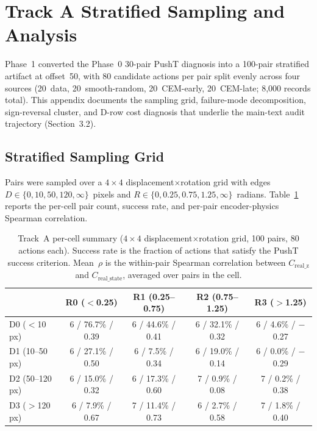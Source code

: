 \section{Track A Stratified Sampling and Analysis}
\label{app:track_a}

Phase~1 converted the Phase~0 30-pair PushT diagnosis into a 100-pair
stratified artifact at offset~50, with 80 candidate actions per pair split
evenly across four sources (20~data, 20~smooth-random, 20~CEM-early,
20~CEM-late; 8{,}000 records total).  This appendix documents the sampling
grid, failure-mode decomposition, sign-reversal cluster, and D-row cost
diagnosis that underlie the main-text audit trajectory (Section~3.2).

\subsection{Stratified Sampling Grid}
\label{app:track_a_grid}

Pairs were sampled over a $4\times 4$ displacement$\times$rotation grid with
edges $D \in \{0, 10, 50, 120, \infty\}$~pixels and
$R \in \{0, 0.25, 0.75, 1.25, \infty\}$~radians.  Table~\ref{tab:track-a-grid}
reports the per-cell pair count, success rate, and per-pair encoder-physics
Spearman correlation.

\begin{table}[h]
\centering
\caption{Track~A per-cell summary ($4\times 4$ displacement$\times$rotation
grid, 100 pairs, 80 actions each).  Success rate is the fraction of actions
that satisfy the PushT success criterion.  Mean~$\rho$ is the within-pair
Spearman correlation between $C_\text{real\_z}$ and $C_\text{real\_state}$,
averaged over pairs in the cell.}
\label{tab:track-a-grid}
\begin{tabular}{lcccc}
\toprule
 & R0 ($<$0.25) & R1 (0.25--0.75) & R2 (0.75--1.25) & R3 ($>$1.25) \\
\midrule
D0 ($<$10\,px) & 6 / 76.7\% / 0.39 & 6 / 44.6\% / 0.41 & 6 / 32.1\% / 0.32 & 6 / 4.6\% / $-$0.27 \\
D1 (10--50\,px) & 6 / 27.1\% / 0.50 & 6 / 7.5\% / 0.34 & 6 / 19.0\% / 0.14 & 6 / 0.0\% / $-$0.29 \\
D2 (50--120\,px) & 6 / 15.0\% / 0.32 & 6 / 17.3\% / 0.60 & 7 / 0.9\% / 0.08 & 7 / 0.2\% / 0.38 \\
D3 ($>$120\,px) & 6 / 7.9\% / 0.67 & 7 / 11.4\% / 0.73 & 6 / 2.7\% / 0.58 & 7 / 1.8\% / 0.40 \\
\bottomrule
\end{tabular}
\end{table}

